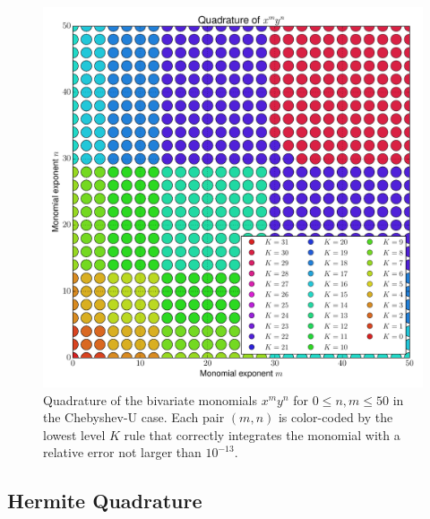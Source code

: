 \documentclass[a4paper,10pt]{article}
\begin{document}
\begin{figure}[h]
  \centering
  \includegraphics[width=\linewidth]{./img/monomial_errors_chebyshevu_2D.pdf}
  \caption{Quadrature of the bivariate monomials $x^m y^n$ for $0 \leq n, m \leq 50$
  in the Chebyshev-U case.
  Each pair $(m,n)$ is color-coded by the lowest level $K$ rule that correctly
  integrates the monomial with a relative error not larger than $10^{-13}$.}
  \label{fig:monomial_errors_chebyshevu_2D}
\end{figure}

\FloatBarrier
\subsection{Hermite Quadrature}
\end{document}
